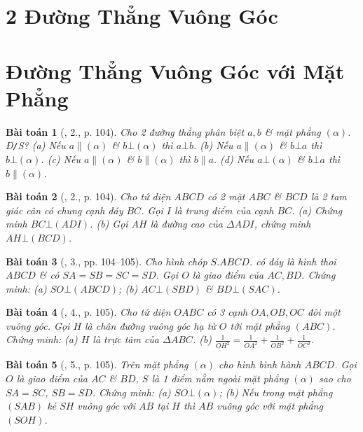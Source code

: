\documentclass{article}
\numberwithin{equation}{section}
\newtheorem{baitoan}{Bài toán}
\begin{document}

\section{2 Đường Thẳng Vuông Góc}


\section{Đường Thẳng Vuông Góc với Mặt Phẳng}

\begin{baitoan}[\cite{SGK_Toan_11_hinh_hoc_co_ban}, 2., p. 104]
	Cho 2 đường thẳng phân biệt $a,b$ \& mặt phẳng $(\alpha)$. \emph{Đ\texttt{/}S?} (a)  Nếu $a\parallel(\alpha)$ \& $b\bot(\alpha)$ thì $a\bot b$. (b) Nếu $a\parallel(\alpha)$ \& $b\bot a$ thì $b\bot(\alpha)$. (c) Nếu $a\parallel(\alpha)$ \& $b\parallel(\alpha)$ thì $b\parallel a$. (d) Nếu $a\bot(\alpha)$ \& $b\bot a$ thì $b\parallel(\alpha)$.
\end{baitoan}

\begin{baitoan}[\cite{SGK_Toan_11_hinh_hoc_co_ban}, 2., p. 104]
	Cho tứ diện $ABCD$ có 2 mặt $ABC$ \& $BCD$ là 2 tam giác cân có chung cạnh đáy $BC$. Gọi $I$ là trung điểm của cạnh $BC$. (a) Chứng minh $BC\bot(ADI)$. (b) Gọi $AH$ là đường cao của $\Delta ADI$, chứng minh $AH\bot(BCD)$.
\end{baitoan}

\begin{baitoan}[\cite{SGK_Toan_11_hinh_hoc_co_ban}, 3., pp. 104--105]
	Cho hình chóp $S.ABCD$. có đáy là hình thoi $ABCD$ \& có $SA = SB = SC = SD$. Gọi $O$ là giao điểm của $AC,BD$. Chứng minh: (a) $SO\bot(ABCD)$; (b) $AC\bot(SBD)$ \& $BD\bot(SAC)$.
\end{baitoan}

\begin{baitoan}[\cite{SGK_Toan_11_hinh_hoc_co_ban}, 4., p. 105]
	Cho tứ diện $OABC$ có 3 cạnh $OA,OB,OC$ đôi một vuông góc. Gọi $H$ là chân đường vuông góc hạ từ $O$ tới mặt phẳng $(ABC)$. Chứng minh: (a) $H$ là trực tâm của $\Delta ABC$. (b) $\frac{1}{OH^2} = \frac{1}{OA^2} + \frac{1}{OB^2} + \frac{1}{OC^2}$. 
\end{baitoan}

\begin{baitoan}[\cite{SGK_Toan_11_hinh_hoc_co_ban}, 5., p. 105]
	Trên mặt phẳng $(\alpha)$ cho hình bình hành $ABCD$. Gọi $O$ là giao điểm của $AC$ \& $BD$, $S$ là 1 điểm nằm ngoài mặt phẳng $(\alpha)$ sao cho $SA = SC$, $SB = SD$. Chứng minh: (a) $SO\bot(\alpha)$; (b) Nếu trong mặt phẳng $(SAB)$ kẻ $SH$ vuông góc với $AB$ tại $H$ thì $AB$ vuông góc với mặt phẳng $(SOH)$.
\end{baitoan}
\end{document}

